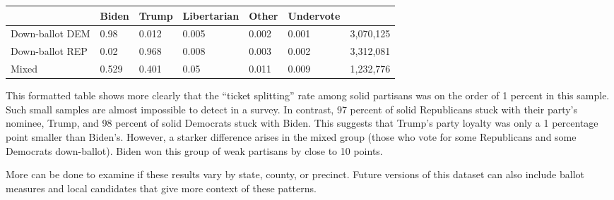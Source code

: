 \documentclass[fleqn,10pt]{wlscirep}
\begin{document}
\begin{tabular}[t]{lllllll}
\toprule
  & Biden & Trump & Libertarian & Other & Undervote & \\
\midrule
Down-ballot DEM & 0.98 & 0.012 & 0.005 & 0.002 & 0.001 & 3,070,125\\
Down-ballot REP & 0.02 & 0.968 & 0.008 & 0.003 & 0.002 & 3,312,081\\
Mixed & 0.529 & 0.401 & 0.05 & 0.011 & 0.009 & 1,232,776\\
\bottomrule
\end{tabular}

This formatted table shows more clearly that the ``ticket splitting''
rate among solid partisans was on the order of 1 percent in this sample.
Such small samples are almost impossible to detect in a survey. In
contrast, 97 percent of solid Republicans stuck with their party's
nominee, Trump, and 98 percent of solid Democrats stuck with Biden. This
suggests that Trump's party loyalty was only a 1 percentage point
smaller than Biden's. However, a starker difference arises in the mixed
group (those who vote for some Republicans and some Democrats
down-ballot). Biden won this group of weak partisans by close to 10
points.

More can be done to examine if these results vary by state, county, or
precinct. Future versions of this dataset can also include ballot
measures and local candidates that give more context of these patterns.
\end{document}
